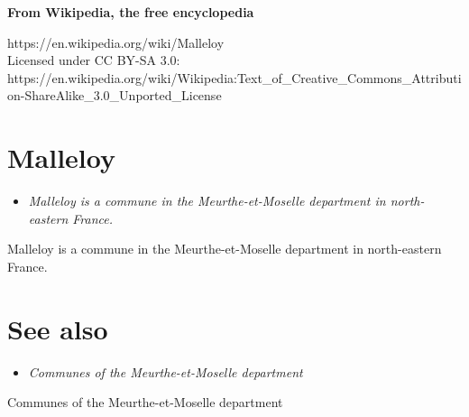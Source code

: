 \textbf{From Wikipedia, the free encyclopedia}

https://en.wikipedia.org/wiki/Malleloy\\
Licensed under CC BY-SA 3.0:\\
https://en.wikipedia.org/wiki/Wikipedia:Text\_of\_Creative\_Commons\_Attribution-ShareAlike\_3.0\_Unported\_License

\section{Malleloy}\label{malleloy}

\begin{itemize}
\item
  \emph{Malleloy is a commune in the Meurthe-et-Moselle department in
  north-eastern France.}
\end{itemize}

Malleloy is a commune in the Meurthe-et-Moselle department in
north-eastern France.

\section{See also}\label{see-also}

\begin{itemize}
\item
  \emph{Communes of the Meurthe-et-Moselle department}
\end{itemize}

Communes of the Meurthe-et-Moselle department
